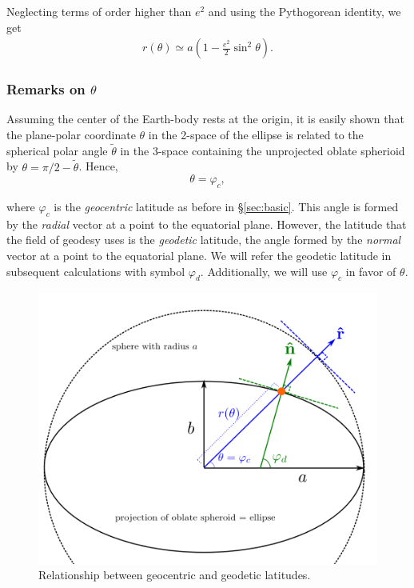 \documentclass[10pt]{article}
\begin{document}
Neglecting terms of order higher than $e^2$ and using the Pythogorean identity, we get
\begin{align} \label{eq:ellipsee_approx}
r(\theta) \simeq a \left(1 - \frac{e^2}{2} \sin^2 \theta\right).
\end{align}

\subsubsection{Remarks on $\theta$}

Assuming the center of the Earth-body rests at the origin, it is easily shown that the plane-polar coordinate $\theta$ in the 2-space of the ellipse is related to the spherical polar angle $\tilde{\theta}$ in the 3-space containing the unprojected oblate spherioid by $\theta = \pi / 2 -\tilde{\theta} $. Hence, 
$$
\theta = \varphi_c,
$$

where $\varphi_c$ is the \emph{geocentric} latitude as before in \S \ref{sec:basic}. This angle is formed by the \emph{radial} vector at a point to the equatorial plane. However, the latitude that the field of geodesy uses is the \emph{geodetic} latitude, the angle formed by the \emph{normal} vector at a point to the equatorial plane. We will refer the geodetic latitude in subsequent calculations with symbol $\varphi_{d}$. Additionally, we will use $\varphi_c$ in favor of $\theta$.

\begin{figure}[!h]
	\centering
		\includegraphics[width=130mm]{spheroid_1b.png}
	\caption{Relationship between geocentric and geodetic latitudes.}
	\label{fig:geodeticlat}
\end{figure}
\end{document}
